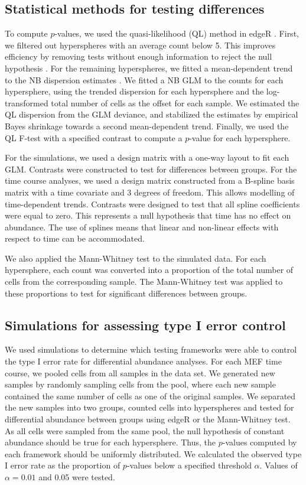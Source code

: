 \documentclass{article}
\begin{document}
\subsection{Statistical methods for testing differences}
To compute $p$-values, we used the quasi-likelihood (QL) method in edgeR \cite{lund2012detecting}.
First, we filtered out hyperspheres with an average count below 5.
This improves efficiency by removing tests without enough information to reject the null hypothesis \cite{bourgon2010independent}.
For the remaining hyperspheres, we fitted a mean-dependent trend to the NB dispersion estimates \cite{mccarthy2012differential}.
We fitted a NB GLM to the counts for each hypersphere, using the trended dispersion for each hypersphere and the log-transformed total number of cells as the offset for each sample.
We estimated the QL dispersion from the GLM deviance, and stabilized the estimates by empirical Bayes shrinkage towards a second mean-dependent trend.
Finally, we used the QL F-test with a specified contrast to compute a $p$-value for each hypersphere.

For the simulations, we used a design matrix with a one-way layout to fit each GLM.
Contrasts were constructed to test for differences between groups.
For the time course analyses, we used a design matrix constructed from a B-spline basis matrix with a time covariate and 3 degrees of freedom.
This allows modelling of time-dependent trends.
Contrasts were designed to test that all spline coefficients were equal to zero.
This represents a null hypothesis that time has no effect on abundance.
The use of splines means that linear and non-linear effects with respect to time can be accommodated.

We also applied the Mann-Whitney test to the simulated data.
For each hypersphere, each count was converted into a proportion of the total number of cells from the corresponding sample.
The Mann-Whitney test was applied to these proportions to test for significant differences between groups.

\subsection{Simulations for assessing type I error control}
We used simulations to determine which testing frameworks were able to control the type I error rate for differential abundance analyses.
For each MEF time course, we pooled cells from all samples in the data set.
We generated new samples by randomly sampling cells from the pool, where each new sample contained the same number of cells as one of the original samples.
We separated the new samples into two groups, counted cells into hyperspheres and tested for differential abundance between groups using edgeR or the Mann-Whitney test.
As all cells were sampled from the same pool, the null hypothesis of constant abundance should be true for each hypersphere.
Thus, the $p$-values computed by each framework should be uniformly distributed.
We calculated the observed type I error rate as the proportion of $p$-values below a specified threshold $\alpha$.
Values of $\alpha=0.01$ and 0.05 were tested.
\end{document}
